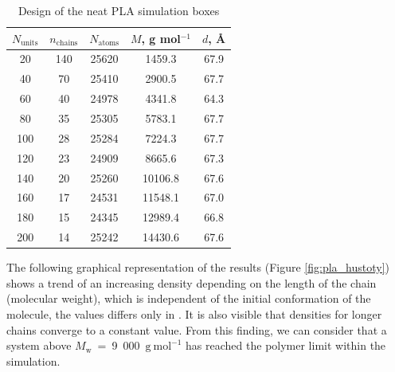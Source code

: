 \begin{table}[h]
	\centering
	\caption{Design of the neat PLA simulation boxes}
	\label{tab:pla_chains}
	\begin{tabular}{ccccc}
		\toprule
		\textbf{\boldmath$N_{\text{units}}$} & \textbf{\boldmath$n_{\text{chains}}$} & \textbf{\boldmath$N_{\text{atoms}}$} & \textbf{\boldmath$M$, g mol$^{-1}$} & \textbf{\boldmath$d$, \AA} \\
		\midrule
		20 & 140 & 25620 & 1459.3 & 67.9 \\
		40 & 70 & 25410 & 2900.5 & 67.7 \\
		60 & 40 & 24978 & 4341.8 & 64.3 \\
		80 & 35 & 25305 & 5783.1 & 67.7 \\
		100 & 28 & 25284 & 7224.3 & 67.7 \\
		120 & 23 & 24909 & 8665.6 & 67.3 \\
		140 & 20 & 25260 & 10106.8 & 67.6 \\
		160 & 17 & 24531 & 11548.1 & 67.0 \\
		180 & 15 & 24345 & 12989.4 & 66.8 \\
		200 & 14 & 25242 & 14430.6 & 67.6 \\
		\bottomrule
	\end{tabular}
\end{table}

The following graphical representation of the results (Figure \ref{fig:pla_hustoty}) shows a trend of an increasing density depending on the length of the chain (molecular weight), which is independent of the initial conformation of the molecule, the values differs only in . It is also visible that densities for longer chains converge to a constant value. From this finding, we can consider that a system above $M_\mathrm{w}$~=~9~000~$\mathrm{g \ mol^{-1}}$ has reached the polymer limit within the simulation.

